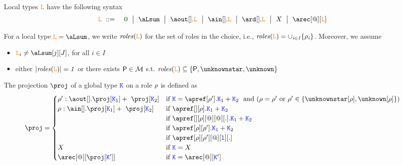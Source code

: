 Local types $\texttt{\textcolor{orange}L}$ have the following syntax
\begin{eqnarray*}
  \aL & \bnfdef & \nil \bnfmid
                  \aLsum \bnfmid
                  \aout[].\aL \bnfmid
                  \ain[].\aL \bnfmid
                  \ard[].\aL \bnfmid
                  X \bnfmid
                  \arec[@][\aL]
\end{eqnarray*}

For a local type $\aL = \aLsum$, we write $\it{roles}(\texttt{\textcolor{orange}L})$ for the set
of roles in the choice, i.e.,
$\it{roles}(\texttt{\textcolor{orange}L}) = \cup_{i\in I}{\{\rho_i\}}$.
%
Moreover, we assume
\begin{itemize}
\item $\aL_i \neq\aLsum[j][J]$, for all $i \in I$
\item either $| \it{roles}(\texttt{\textcolor{orange}L})| = 1$ or there exists $\amulti
  P\in\multiroles$ s.t. $\sumRoles \aL \subseteq \{\amulti P,
  \unknownstar, \unknown\}$
\end{itemize}

The projection $\proj$ of a global type $\texttt{\textcolor{blue}K}$ on a role $\rho$ is
defined as
\[
  \proj =
  \begin{cases}
    \arole' : \aout[].\proj[\aK_1] +\  \proj[\aK_2]  
    & \text{if } 
        \aK = \apref[\arole'].\aK_1 + \aK_2  \ \text{ and }
        (\arole = \arole' \text{ or } \arole' \in \{\unknownstar[\arole],\unknown[\arole]\})
    \\
    \arole : \ain[].\proj[\aK_1] +\  \proj[\aK_2]  
    & \text{if } 
    \apref[{}][\arole].\aK_1 + \aK_2
    \\
    & \text{if } 
    \apref[{}][\arole][@][@][.].\aK_1 + \aK_2
    \\
    & \text{if } 
    \apref[\arole][\arole'].\aK_1 + \aK_2 
    \\
    & \text{if } 
    \apref[\arole][\arole'][@][\aloc][.]
    \\
    X & \text{if } \aK = X \\
    \arec[@][{\proj[\aK']}] & \text{if } \aK = \arec[@][\aK']
  \end{cases}
\]


